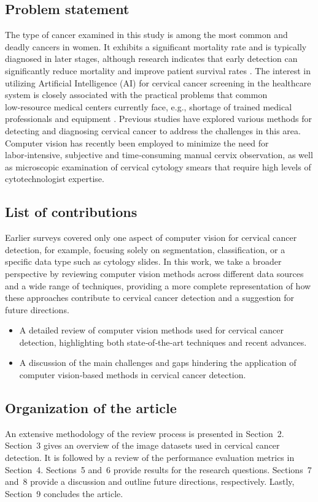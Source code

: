 \documentclass[final,5p,times,twocolumn,authoryear]{elsarticle}
\begin{document}
\subsection{Problem statement}
The type of cancer examined in this study is among the most common and deadly cancers in women. It exhibits a significant mortality rate and is typically diagnosed in later stages, although research indicates that early detection can significantly reduce mortality and improve patient survival rates \cite{ref14}. The interest in utilizing Artificial Intelligence (AI) for cervical cancer screening in the healthcare system is closely associated with the practical problems that common low‑resource medical centers currently face, e.g., shortage of trained medical professionals and equipment \cite{ref15}. Previous studies have explored various methods for detecting and diagnosing cervical cancer to address the challenges in this area. Computer vision has recently been employed to minimize the need for labor‑intensive, subjective and time‑consuming manual cervix observation, as well as microscopic examination of cervical cytology smears that require high levels of cytotechnologist expertise.
\subsection{List of contributions}
Earlier surveys covered only one aspect of computer vision for cervical cancer detection, for example, focusing solely on segmentation, classification, or a specific data type such as cytology slides. In this work, we take a broader perspective by reviewing computer vision methods across different data sources and a wide range of techniques, providing a more complete representation of how these approaches contribute to cervical cancer detection and a suggestion for future directions.
\begin{itemize}
\item A detailed review of computer vision methods used for cervical cancer detection, highlighting both state‑of‑the‑art techniques and recent advances.
\item A discussion of the main challenges and gaps hindering the application of computer vision‑based methods in cervical cancer detection.
\end{itemize}
\subsection{Organization of the article}
An extensive methodology of the review process is presented in Section~2. Section~3 gives an overview of the image datasets used in cervical cancer detection. It is followed by a review of the performance evaluation metrics in Section~4. Sections~5 and~6 provide results for the research questions. Sections~7 and~8 provide a discussion and outline future directions, respectively. Lastly, Section~9 concludes the article.
\end{document}
